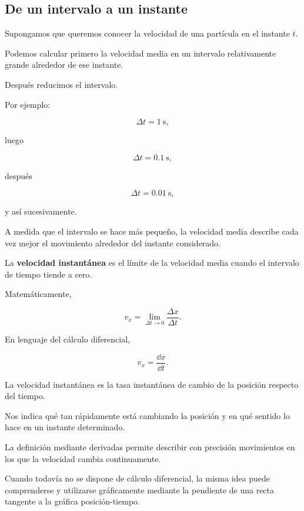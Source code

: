 \subsection{De un intervalo a un instante}

Supongamos que queremos conocer la velocidad de una partícula en el instante
\(t\).

Podemos calcular primero la velocidad media en un intervalo relativamente
grande alrededor de ese instante.

Después reducimos el intervalo.

Por ejemplo:

\[
\Delta t=\SI{1}{\second},
\]

luego

\[
\Delta t=\SI{0.1}{\second},
\]

después

\[
\Delta t=\SI{0.01}{\second},
\]

y así sucesivamente.

A medida que el intervalo se hace más pequeño, la velocidad media describe
cada vez mejor el movimiento alrededor del instante considerado.

\begin{definicion}
La \textbf{velocidad instantánea} es el límite de la velocidad media cuando
el intervalo de tiempo tiende a cero.
\end{definicion}

Matemáticamente,

\[ \boxed{v_x=\lim_{\Delta t\to0}\frac{\Delta x}{\Delta t}}. \]

En lenguaje del cálculo diferencial,

\[ \boxed{v_x=\frac{\dd x}{\dd t}}. \]

\begin{interpretacion}
La velocidad instantánea es la tasa instantánea de cambio de la posición
respecto del tiempo.

Nos indica qué tan rápidamente está cambiando la posición y en qué sentido
lo hace en un instante determinado.
\end{interpretacion}

\begin{nota}
La definición mediante derivadas permite describir con precisión movimientos
en los que la velocidad cambia continuamente.

Cuando todavía no se dispone de cálculo diferencial, la misma idea puede
comprenderse y utilizarse gráficamente mediante la pendiente de una recta
tangente a la gráfica posición-tiempo.
\end{nota}


